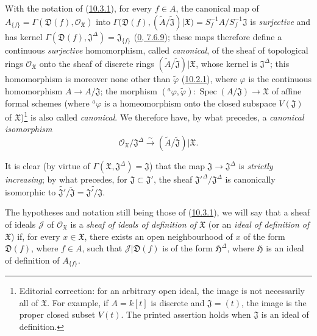 \begin{env}[10.3.2]
\label{I.10.3.2}
With the notation of (\hyperref[I.10.3.1]{10.3.1}), for every $f\in A$,
the canonical map of
$A_{\{f\}}=\Gamma(\mathfrak{D}(f),\mathscr{O}_{\mathfrak{X}})$ into
$\Gamma\bigl(\mathfrak{D}(f),
(\widetilde{A}/\widetilde{\mathfrak{J}})|\mathfrak{X}\bigr)
=S_f^{-1}A/S_f^{-1}\mathfrak{J}$
is \emph{surjective} and has kernel
$\Gamma(\mathfrak{D}(f),\mathfrak{J}^\Delta)=\mathfrak{J}_{\{f\}}$
(\hyperref[0.7.6.9]{0, 7.6.9}); these maps therefore define a
continuous \emph{surjective} homomorphism, called \emph{canonical}, of the
sheaf of topological rings $\mathscr{O}_{\mathfrak{X}}$ onto the sheaf of
discrete rings
$(\widetilde{A}/\widetilde{\mathfrak{J}})|\mathfrak{X}$, whose kernel is
$\mathfrak{J}^\Delta$; this homomorphism is moreover none other than
$\widetilde{\varphi}$ (\hyperref[I.10.2.1]{10.2.1}), where $\varphi$ is
the continuous homomorphism $A\to A/\mathfrak{J}$; the morphism
$({}^a\varphi,\widetilde{\varphi}):
\operatorname{Spec}(A/\mathfrak{J})\to\mathfrak{X}$ of affine formal
schemes (where ${}^a\varphi$ is a homeomorphism onto the closed subspace $V(\mathfrak{J})$ of $\mathfrak{X}$)\footnote{Editorial correction: for an arbitrary open ideal, the image is not necessarily all of $\mathfrak{X}$. For example, if $A=k[t]$ is discrete and $\mathfrak{J}=(t)$, the image is the proper closed subset $V(t)$. The printed assertion holds when $\mathfrak{J}$ is an ideal of definition.} is also called \emph{canonical}. We therefore have,
by what precedes, a \emph{canonical isomorphism}
\[
  \mathscr{O}_{\mathfrak{X}}/\mathfrak{J}^\Delta
  \xrightarrow{\sim}
  (\widetilde{A}/\widetilde{\mathfrak{J}})|\mathfrak{X}.
  \tag{10.3.2.1}\label{I.10.3.2.1}
\]

It is clear (by virtue of
$\Gamma(\mathfrak{X},\mathfrak{J}^\Delta)=\mathfrak{J}$) that
the map $\mathfrak{J}\to\mathfrak{J}^\Delta$ is
\emph{strictly increasing}; by what precedes, for
$\mathfrak{J}\subset\mathfrak{J}'$, the sheaf
${\mathfrak{J}'}^\Delta/\mathfrak{J}^\Delta$ is canonically isomorphic to
$\widetilde{\mathfrak{J}'}/\widetilde{\mathfrak{J}}
=\widetilde{\mathfrak{J}'/\mathfrak{J}}$.
\end{env}

\begin{env}[10.3.3]
\label{I.10.3.3}
The hypotheses and notation still being those of
(\hyperref[I.10.3.1]{10.3.1}), we will say that a sheaf of ideals
$\mathscr{J}$ of $\mathscr{O}_{\mathfrak{X}}$ is a
\emph{sheaf of ideals of definition of $\mathfrak{X}$} (or an
\emph{ideal of definition of $\mathfrak{X}$}) if, for every
$x\in\mathfrak{X}$, there exists an open neighbourhood of $x$ of the form
$\mathfrak{D}(f)$, where $f\in A$, such that
$\mathscr{J}|\mathfrak{D}(f)$ is of the form $\mathfrak{H}^\Delta$, where
$\mathfrak{H}$ is an ideal of definition of $A_{\{f\}}$.
\end{env}


